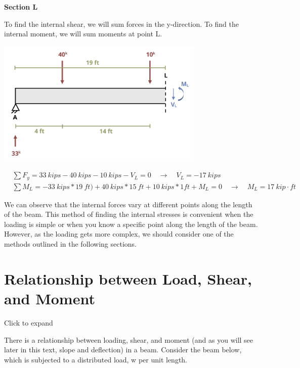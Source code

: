 \documentclass[
  letterpaper,
  DIV=11,
  numbers=noendperiod]{scrreprt}
\begin{document}
\begin{tcolorbox}
\begin{tcolorbox}
\textbf{Section L}

To find the internal shear, we will sum forces in the y-direction. To
find the internal moment, we will sum moments at point L.

\begin{center}
\includegraphics[width=3.90625in,height=\textheight]{images/CH7 PNGs/example 7.1 part 5.png}
\end{center}

\[
\begin{aligned}
&\sum F_y=33{~kips}-40{~kips}-10{~kips}-V_L=0 \quad\rightarrow\quad V_L=-17{~kips} \\
&\sum M_L=-33{~kips}*19{~ft})+40{~kips}*15{~ft}+10{~kips}*1{ft}+M_L=0 \quad\rightarrow\quad
M_L=17{~kip}\cdot{ft}
\end{aligned}
\]

We can observe that the internal forces vary at different points along
the length of the beam. This method of finding the internal stresses is
convenient when the loading is simple or when you know a specific point
along the length of the beam. However, as the loading gets more complex,
we should consider one of the methods outlined in the following
sections.

\end{tcolorbox}

\end{tcolorbox}

\section{Relationship between Load, Shear, and Moment}\label{sec-7.2}

Click to expand

There is a relationship between loading, shear, and moment (and as you
will see later in this text, slope and deflection) in a beam. Consider
the beam below, which is subjected to a distributed load, w per unit
length.
\end{document}
